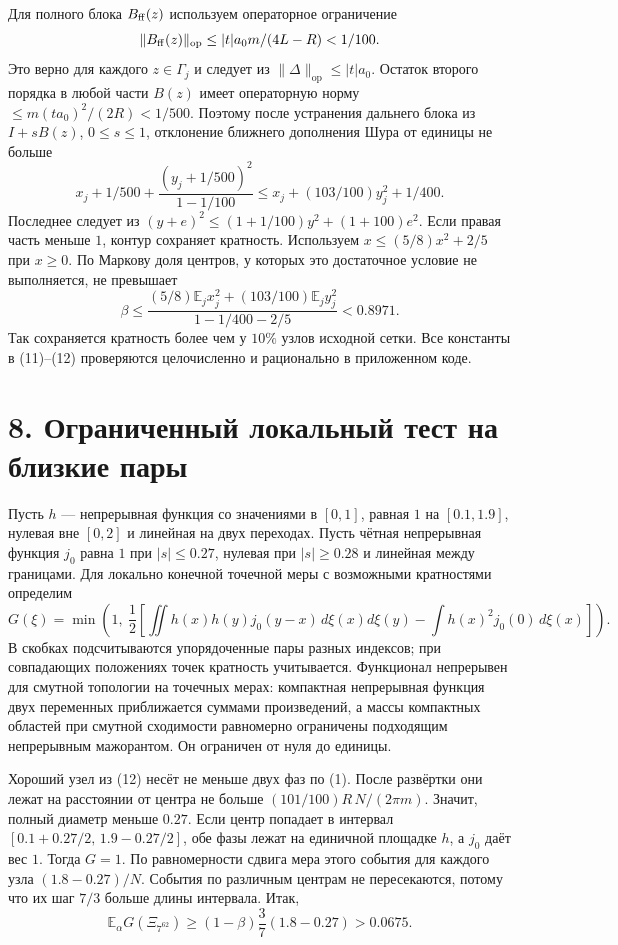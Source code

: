 \documentclass[11pt,a4paper]{article}
\newcommand{\EE}{\mathbb E}
\newcommand{\sect}[1]{\section*{\sffamily\color{ink}#1}}
\newcommand{\op}{\mathrm{op}}
\begin{document}
Для полного блока \(B_{\rm ff}(z)\) используем операторное ограничение
\[
       \|B_{\rm ff}(z)\|_{\op}\le |t|a_0 m/(4L-R)<1/100.
\]
Это верно для каждого \(z\in\Gamma_j\) и следует из \(\|\Delta\|_{\op}\le |t|a_0\). Остаток второго порядка в любой части \(B(z)\) имеет операторную норму \(\le m(t a_0)^2/(2R)<1/500\). Поэтому после устранения дальнего блока из \(I+sB(z)\), \(0\le s\le1\), отклонение ближнего дополнения Шура от единицы не больше
\[
        x_j+1/500+\frac{(y_j+1/500)^2}{1-1/100}
                    \le x_j+(103/100)y_j^2+1/400 .
\]
Последнее следует из \((y+e)^2\le(1+1/100)y^2+(1+100)e^2\). Если правая часть меньше \(1\), контур сохраняет кратность. Используем \(x\le(5/8)x^2+2/5\) при \(x\ge0\). По Маркову доля центров, у которых это достаточное условие не выполняется, не превышает
\[
          \beta\le \frac{(5/8)\EE_j x_j^2+(103/100)\EE_j y_j^2}
                          {1-1/400-2/5}<0.8971.                \tag{12}
\]
Так сохраняется кратность более чем у \(10\%\) узлов исходной сетки. Все константы в (11)--(12) проверяются целочисленно и рационально в приложенном коде.
\newpage
\sect{8. Ограниченный локальный тест на близкие пары}
Пусть \(h\) --- непрерывная функция со значениями в \([0,1]\), равная \(1\) на \([0.1,1.9]\), нулевая вне \([0,2]\) и линейная на двух переходах. Пусть чётная непрерывная функция \(j_0\) равна \(1\) при \(|s|\le0.27\), нулевая при \(|s|\ge0.28\) и линейная между границами. Для локально конечной точечной меры с возможными кратностями определим
\[
 G(\xi)=\min\left(1,\ \frac12\left[
  \iint h(x)h(y)j_0(y-x)\,d\xi(x)d\xi(y)
       -\int h(x)^2 j_0(0)\,d\xi(x)\right]\right).
\]
В скобках подсчитываются упорядоченные пары разных индексов; при совпадающих положениях точек кратность учитывается. Функционал непрерывен для смутной топологии на точечных мерах: компактная непрерывная функция двух переменных приближается суммами произведений, а массы компактных областей при смутной сходимости равномерно ограничены подходящим непрерывным мажорантом. Он ограничен от нуля до единицы.

Хороший узел из (12) несёт не меньше двух фаз по (1). После развёртки они лежат на расстоянии от центра не больше
\((101/100) R\,N/(2\pi m)\). Значит, полный диаметр меньше \(0.27\). Если центр попадает в интервал \([0.1+0.27/2,\,1.9-0.27/2]\), обе фазы лежат на единичной площадке \(h\), а \(j_0\) даёт вес \(1\). Тогда \(G=1\). По равномерности сдвига мера этого события для каждого узла \((1.8-0.27)/N\). События по различным центрам не пересекаются, потому что их шаг \(7/3\) больше длины интервала. Итак,
\[
          \EE_\alpha G(\Xi_{7^{62}})\ge (1-\beta)\frac37(1.8-0.27)
                         >0.0675.
\]
\end{document}
